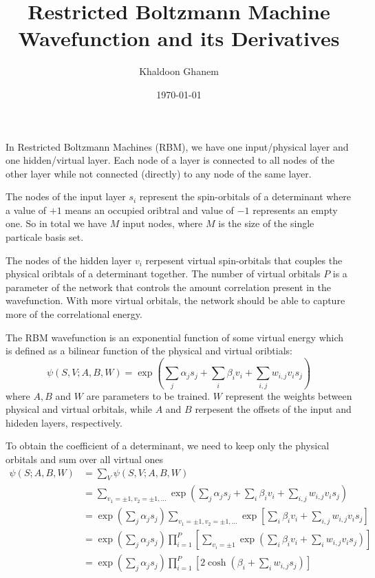 \documentclass[a4paper]{article}
\title{Restricted Boltzmann Machine Wavefunction and its Derivatives}
\author{Khaldoon Ghanem}
\date{\today}
\begin{document}
\maketitle
In Restricted Boltzmann Machines (RBM), we have one input/physical layer and one hidden/virtual layer. 
Each node of a layer is connected to all nodes of the other layer while not connected (directly) to any node of the same layer.

The nodes of the input layer $s_i$ represent the spin-orbitals of a determinant where a value of $+1$ means an occupied oribtral and value of 
$-1$ represents an empty one. So in total we have $M$ input nodes, where $M$ is the size of the single particale basis set.

The nodes of the hidden layer $v_i$ rerpesent virtual spin-orbitals that couples the physical oribtals of a determinant together. 
The number of virtual orbitals $P$ is a parameter of the network that controls the amount correlation present in the wavefunction.
With more virtual orbitals, the network should be able to capture more of the correlational energy.

The RBM wavefunction is an exponential function of some virtual energy which is defined as a bilinear function of the physical and virtual oribtials:
\begin{equation*}
    \psi(S, V ; A, B, W) = \exp \left ( \sum_j \alpha_j s_j + \sum_i \beta_i v_i + \sum_{i,j} w_{i,j} v_i s_j \right)
\end{equation*}
where $A, B$ and $W$ are parameters to be trained.
$W$ represent the weights between physical and virtual orbitals, 
while $A$ and $B$ rerpesent the offsets of the input and hideden layers, respectively.

To obtain the coefficient of a determinant, we need to keep only the physical orbitals and sum over all virtual ones
\begin{align*}
    \psi(S; A, B, W) &= \sum_V \psi(S, V ; A, B, W) \\
                     &= \sum_{v_1=\pm1,v_2=\pm1,...} \exp \left ( \sum_j \alpha_j s_j + \sum_i \beta_i v_i + \sum_{i,j} w_{i,j} v_i s_j \right)\\
                     &= \exp \left (\sum_j \alpha_j s_j \right) \sum_{v_1=\pm1,v_2=\pm1,...}\exp \left [ \sum_i \beta_i v_i + \sum_{i,j} w_{i,j} v_i s_j \right]\\
                     &= \exp \left (\sum_j \alpha_j s_j \right) \prod_{i=1}^P \left [ \sum_{v_i=\pm1}\exp \left ( \sum_i \beta_i v_i + \sum_{i} w_{i,j} v_i s_j \right)\right]\\
                     &= \exp \left (\sum_j \alpha_j s_j \right) \prod_{i=1}^P \left [ 2 \cosh \left ( \beta_i + \sum_{i} w_{i,j} s_j \right)\right]
\end{align*}
\end{document}
